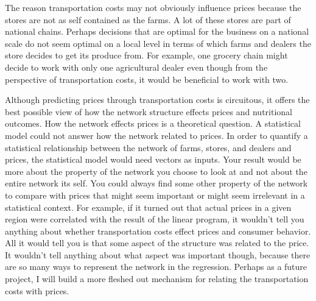 \documentclass{report}
\begin{document}
The reason transportation costs may not obviously influence prices because the stores are not as self contained as the farms. A lot of these stores are part of national chains. Perhaps decisions that are optimal for the business on a national scale do not seem optimal on a local level in terms of which farms and dealers the store decides to get its produce from. For example, one grocery chain might decide to work with only one agricultural dealer even though from the perspective of transportation costs, it would be beneficial to work with two.

Although predicting prices through transportation costs is circuitous, it offers the best possible view of how the network structure effects prices and nutritional outcomes. How the network effects prices is a theoretical question. A statistical model could not answer how the network related to prices. In order to quantify a statistical relationship between the network of farms, stores, and dealers and prices, the statistical model would need vectors as inputs. Your result would be more about the property of the network you choose to look at and not about the entire network its self. You could always find some other property of the network to compare with prices that might seem important or might seem irrelevant in a statistical context. For example, if it turned out that actual prices in a given region were correlated with the result of the linear program, it wouldn't tell you anything about whether transportation costs effect prices and consumer behavior. All it would tell you is that some aspect of the structure was related to the price. It wouldn't tell anything about what aspect was important though, because there are so many ways to represent the network in the regression. Perhaps as a future project, I will build a more fleshed out mechanism for relating the transportation costs with prices.
\end{document}
